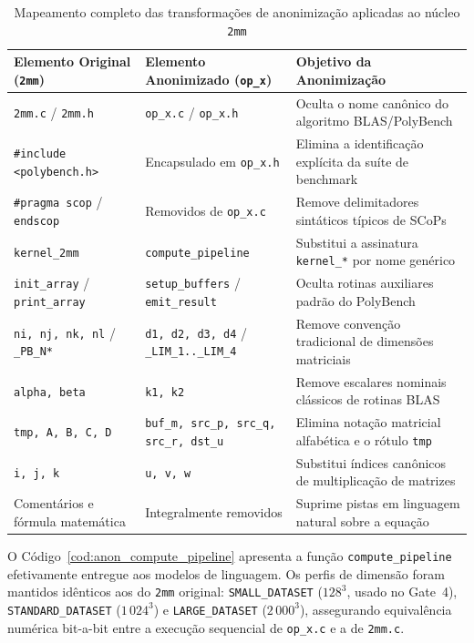 \begin{table}[htbp]
\centering
\caption{Mapeamento completo das transformações de anonimização aplicadas ao núcleo \texttt{2mm}}
\label{tab:anon_mapeamento}
\small
\begin{tabular}{llp{6.2cm}}
\toprule
\textbf{Elemento Original (\texttt{2mm})} & \textbf{Elemento Anonimizado (\texttt{op\_x})} & \textbf{Objetivo da Anonimização} \\
\midrule
\texttt{2mm.c} / \texttt{2mm.h} & \texttt{op\_x.c} / \texttt{op\_x.h} & Oculta o nome canônico do algoritmo BLAS/PolyBench \\
\texttt{\#include <polybench.h>} & Encapsulado em \texttt{op\_x.h} & Elimina a identificação explícita da suíte de benchmark \\
\texttt{\#pragma scop} / \texttt{endscop} & Removidos de \texttt{op\_x.c} & Remove delimitadores sintáticos típicos de SCoPs \\
\texttt{kernel\_2mm} & \texttt{compute\_pipeline} & Substitui a assinatura \texttt{kernel\_*} por nome genérico \\
\texttt{init\_array} / \texttt{print\_array} & \texttt{setup\_buffers} / \texttt{emit\_result} & Oculta rotinas auxiliares padrão do PolyBench \\
\texttt{ni, nj, nk, nl} / \texttt{\_PB\_N*} & \texttt{d1, d2, d3, d4} / \texttt{\_LIM\_1..\_LIM\_4} & Remove convenção tradicional de dimensões matriciais \\
\texttt{alpha, beta} & \texttt{k1, k2} & Remove escalares nominais clássicos de rotinas BLAS \\
\texttt{tmp, A, B, C, D} & \texttt{buf\_m, src\_p, src\_q, src\_r, dst\_u} & Elimina notação matricial alfabética e o rótulo \texttt{tmp} \\
\texttt{i, j, k} & \texttt{u, v, w} & Substitui índices canônicos de multiplicação de matrizes \\
Comentários e fórmula matemática & Integralmente removidos & Suprime pistas em linguagem natural sobre a equação \\
\bottomrule
\end{tabular}
\end{table}

O Código~\ref{cod:anon_compute_pipeline} apresenta a função \texttt{compute\_pipeline} efetivamente entregue aos modelos de linguagem. Os perfis de dimensão foram mantidos idênticos aos do \texttt{2mm} original: \texttt{SMALL\_DATASET} ($128^3$, usado no Gate~4), \texttt{STANDARD\_DATASET} ($1\,024^3$) e \texttt{LARGE\_DATASET} ($2\,000^3$), assegurando equivalência numérica bit-a-bit entre a execução sequencial de \texttt{op\_x.c} e a de \texttt{2mm.c}.

